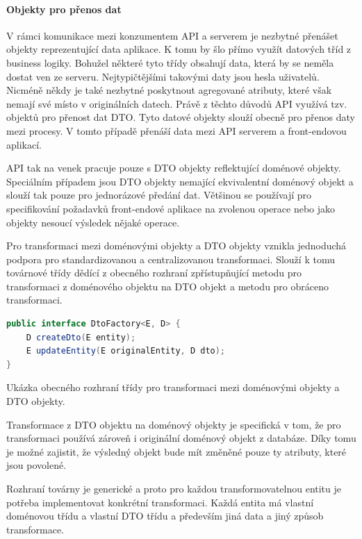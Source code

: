 			\paragraph{Objekty pro přenos dat}

			V rámci komunikace mezi konzumentem \ac{API} a serverem je nezbytné přenášet objekty reprezentující data
			aplikace.
			K tomu by šlo přímo využít datových tříd z business logiky.
			Bohužel některé tyto třídy obsahují data, která by se neměla dostat ven ze serveru.
			Nejtypičtějšími takovými daty jsou hesla uživatelů.
			Nicméně někdy je také nezbytné poskytnout agregované atributy, které však nemají své místo v originálních datech.
			Právě z těchto důvodů \ac{API} využívá tzv. objektů pro přenost dat \ac{DTO}.
			Tyto datové objekty slouží obecně pro přenos daty mezi procesy.
			V tomto případě přenáší data mezi \ac{API} serverem a front-endovou aplikací.

			\ac{API} tak na venek pracuje pouze s \ac{DTO} objekty reflektující doménové objekty.
			Speciálním případem jsou \ac{DTO} objekty nemající ekvivalentní doménový objekt a slouží tak pouze pro jednorázové
			předání dat.
			Většinou se používají pro specifikování požadavků front-endové aplikace na zvolenou operace nebo jako
			objekty nesoucí výsledek nějaké operace.

			Pro transformaci mezi doménovými objekty a \ac{DTO} objekty vznikla jednoduchá podpora pro standardizovanou
			a centralizovanou transformaci.
			Slouží k tomu továrnové třídy dědící z obecného rozhraní zpřístupňující metodu pro transformaci z doménového
			objektu na \ac{DTO} objekt a metodu pro obráceno transformaci.

			\begin{lstlisting}[language=Java]
public interface DtoFactory<E, D> {
    D createDto(E entity);
    E updateEntity(E originalEntity, D dto);
}
			\end{lstlisting}
			Ukázka obecného rozhraní třídy pro transformaci mezi doménovými objekty a DTO objekty. %

			Transformace z \ac{DTO} objektu na doménový objekty je specifická v tom, že pro transformaci používá zároveň
			i originální doménový objekt z databáze.
			Díky tomu je možné zajistit, že výsledný objekt bude mít změněné pouze ty atributy, které jsou povolené.

			Rozhraní továrny je generické a proto pro každou transformovatelnou entitu je potřeba implementovat konkrétní
			transformaci.
			Každá entita má vlastní doménovou třídu a vlastní \ac{DTO} třídu a především jiná data a jiný způsob transformace.

